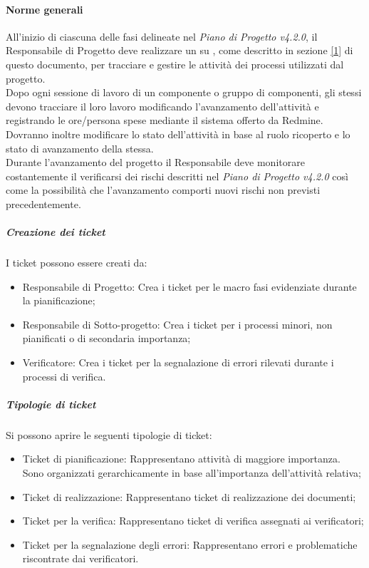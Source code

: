 \paragraph{Norme generali}
All'inizio di ciascuna delle fasi delineate nel \emph{Piano di Progetto v4.2.0}, il Responsabile di Progetto deve realizzare un  su , come descritto in sezione \ref{1} di questo documento, per tracciare e gestire le attività dei processi utilizzati dal progetto.\\
Dopo ogni sessione di lavoro di un componente o gruppo di componenti, gli stessi devono tracciare il loro lavoro modificando l'avanzamento dell'attività e registrando le ore/persona spese mediante il sistema offerto da Redmine.
Dovranno inoltre modificare lo stato dell'attività in base al ruolo ricoperto e lo stato di avanzamento della stessa.\\
Durante l'avanzamento del progetto il Responsabile  deve monitorare costantemente il verificarsi dei rischi descritti nel \emph{Piano di Progetto v4.2.0} così come la possibilità che l'avanzamento comporti nuovi rischi non previsti precedentemente.

\subparagraph{Creazione dei ticket}
I ticket possono essere creati da:
\begin{itemize}
\item Responsabile di Progetto: Crea i ticket per le macro fasi evidenziate durante la pianificazione;
\item Responsabile di Sotto-progetto: Crea i ticket per i processi minori, non pianificati o di secondaria importanza;
\item Verificatore: Crea i ticket per la segnalazione di errori rilevati durante i processi di verifica.
\end{itemize}

\subparagraph{Tipologie di ticket}

Si possono aprire le seguenti tipologie di ticket:
\begin{itemize}
\item Ticket di pianificazione: Rappresentano attività di maggiore importanza. Sono organizzati gerarchicamente in base all'importanza dell'attività relativa;
\item Ticket di realizzazione: Rappresentano ticket di realizzazione dei documenti;
\item Ticket per la verifica: Rappresentano ticket di verifica assegnati ai verificatori;
\item Ticket per la segnalazione degli errori: Rappresentano errori e problematiche riscontrate dai verificatori.

\end{itemize}

